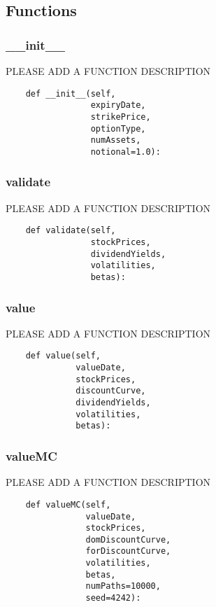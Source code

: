 \documentclass[twoside,11pt]{book}
\begin{document}
\subsection*{Functions}

\subsubsection*{{\bf \_\_init\_\_}}
PLEASE ADD A FUNCTION DESCRIPTION

\begin{lstlisting}
    def __init__(self,
                 expiryDate,
                 strikePrice,
                 optionType,
                 numAssets,
                 notional=1.0):
\end{lstlisting}

\subsubsection*{{\bf validate}}
PLEASE ADD A FUNCTION DESCRIPTION

\begin{lstlisting}
    def validate(self,
                 stockPrices,
                 dividendYields,
                 volatilities,
                 betas):
\end{lstlisting}

\subsubsection*{{\bf value}}
PLEASE ADD A FUNCTION DESCRIPTION

\begin{lstlisting}
    def value(self,
              valueDate,
              stockPrices,
              discountCurve,
              dividendYields,
              volatilities,
              betas):
\end{lstlisting}

\subsubsection*{{\bf valueMC}}
PLEASE ADD A FUNCTION DESCRIPTION

\begin{lstlisting}
    def valueMC(self,
                valueDate,
                stockPrices,
                domDiscountCurve,
                forDiscountCurve,
                volatilities,
                betas,
                numPaths=10000,
                seed=4242):
\end{lstlisting}
\end{document}
